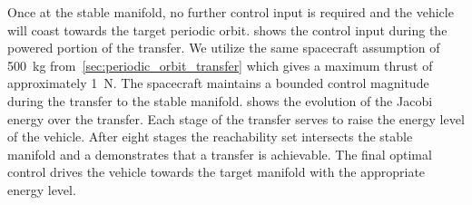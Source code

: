 \documentclass[smallcondensed]{svjour3}
\begin{document}
Once at the stable manifold, no further control input is required and the vehicle will coast towards the target periodic orbit.
 shows the control input during the powered portion of the transfer. 
We utilize the same spacecraft assumption of \SI{500}{\kilo\gram} from~\cref{sec:periodic_orbit_transfer} which gives a maximum thrust of approximately \SI{1}{\newton}.
The spacecraft maintains a bounded control magnitude during the transfer to the stable manifold.
 shows the evolution of the Jacobi energy over the transfer.
Each stage of the transfer serves to raise the energy level of the vehicle.
After eight stages the reachability set intersects the stable manifold and a demonstrates that a transfer is achievable.
The final optimal control drives the vehicle towards the target manifold with the appropriate energy level.
\end{document}

